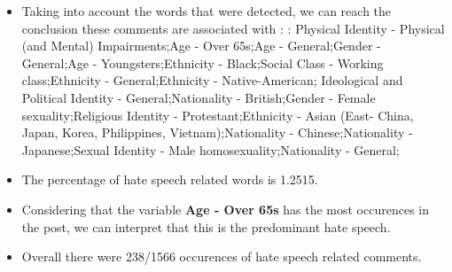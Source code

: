 \documentclass[11pt]{article}
\begin{document}
\begin{itemize}\item Taking into account the words that were detected, we can reach the conclusion these comments are associated with : : Physical Identity - Physical (and Mental) Impairments;Age - Over 65s;Age - General;Gender - General;Age - Youngsters;Ethnicity - Black;Social Class - Working class;Ethnicity - General;Ethnicity - Native-American; Ideological and Political Identity - General;Nationality - British;Gender - Female sexuality;Religious Identity - Protestant;Ethnicity - Asian (East- China, Japan, Korea, Philippines, Vietnam);Nationality - Chinese;Nationality - Japanese;Sexual Identity - Male homosexuality;Nationality - General;%

\item The percentage of hate speech related words is 1.2515.

\item Considering that the variable \textbf{Age - Over 65s} has the most occurences in the post, we can interpret that this is the predominant hate speech.

\item Overall there were 238/1566 occurences of hate speech related comments.\end{itemize}
\end{document}
